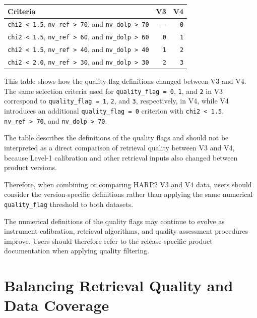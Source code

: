 \documentclass[
  11pt,
  letterpaper,
]{scrreprt}
\begin{document}
\begin{longtable}[]{@{}lrr@{}}
\toprule\noalign{}
Criteria & V3 & V4 \\
\midrule\noalign{}
\endhead
\bottomrule\noalign{}
\endlastfoot
\texttt{chi2\ \textless{}\ 1.5}, \texttt{nv\_ref\ \textgreater{}\ 70},
and \texttt{nv\_dolp\ \textgreater{}\ 70} & --- & \texttt{0} \\
\texttt{chi2\ \textless{}\ 1.5}, \texttt{nv\_ref\ \textgreater{}\ 60},
and \texttt{nv\_dolp\ \textgreater{}\ 60} & \texttt{0} & \texttt{1} \\
\texttt{chi2\ \textless{}\ 1.5}, \texttt{nv\_ref\ \textgreater{}\ 40},
and \texttt{nv\_dolp\ \textgreater{}\ 40} & \texttt{1} & \texttt{2} \\
\texttt{chi2\ \textless{}\ 2.0}, \texttt{nv\_ref\ \textgreater{}\ 30},
and \texttt{nv\_dolp\ \textgreater{}\ 30} & \texttt{2} & \texttt{3} \\
\end{longtable}

This table shows how the quality-flag definitions changed between V3 and
V4. The same selection criteria used for \texttt{quality\_flag\ =\ 0},
\texttt{1}, and \texttt{2} in V3 correspond to
\texttt{quality\_flag\ =\ 1}, \texttt{2}, and \texttt{3}, respectively,
in V4, while V4 introduces an additional \texttt{quality\_flag\ =\ 0}
criterion with \texttt{chi2\ \textless{}\ 1.5},
\texttt{nv\_ref\ \textgreater{}\ 70}, and
\texttt{nv\_dolp\ \textgreater{}\ 70}.

The table describes the definitions of the quality flags and should not
be interpreted as a direct comparison of retrieval quality between V3
and V4, because Level-1 calibration and other retrieval inputs also
changed between product versions.

Therefore, when combining or comparing HARP2 V3 and V4 data, users
should consider the version-specific definitions rather than applying
the same numerical \texttt{quality\_flag} threshold to both datasets.

The numerical definitions of the quality flags may continue to evolve as
instrument calibration, retrieval algorithms, and quality assessment
procedures improve. Users should therefore refer to the release-specific
product documentation when applying quality filtering.

\section{Balancing Retrieval Quality and Data
Coverage}\label{balancing-retrieval-quality-and-data-coverage}
\end{document}
